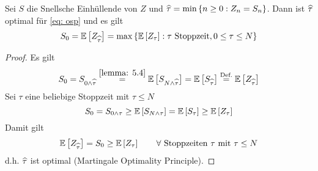\begin{theorem} %
	\label{theorem: 6.5}
	Sei $S$ die Snellsche Einhüllende von $Z$ und $\widehat{\tau} = \min\left\{ n \ge 0 : Z_n = S_n \right\}$. Dann ist $\widehat{\tau}$ optimal für \eqref{eq: osp} und es gilt
	\begin{equation*}
		S_0 = \mathbb{E} \left[ Z_{\widehat{\tau}} \right] = \max\left\{ \mathbb{E} \left[ Z_\tau \right] : \tau \text{ Stoppzeit}, 0 \le \tau \le N \right\}
	\end{equation*}
\end{theorem}
\begin{proof}
	Es gilt
	\begin{equation*}
		S_0 = S_{0 \land \dach{\tau}} \overset{\cref{lemma: 5.4}}{=} \EW[S_{N \land \dach{\tau}}] = \EW[S_{\dach{\tau}}] \overset{\text{Def.}}{=} \EW[Z_{\dach{\tau}}]
	\end{equation*}
	Sei $\tau$ eine beliebige Stoppzeit  mit $\tau \le N$
	\begin{equation*}
		S_0 = S_{0 \land \tau} \ge \mathbb{E} \left[ S_{N \land \tau} \right] = \mathbb{E} \left[ S_\tau \right] \ge \mathbb{E} \left[ Z_\tau \right]
	\end{equation*}
	Damit gilt
	\begin{equation*}
		\mathbb{E} \left[ Z_{\widehat{\tau}} \right] = S_0 \ge \mathbb{E} \left[ Z_\tau \right] \qquad \forall \text{ Stoppzeiten } \tau \text{ mit } \tau \le N
	\end{equation*}
	d.h. $\widehat{\tau}$ ist optimal (Martingale Optimality Principle).
\end{proof}

